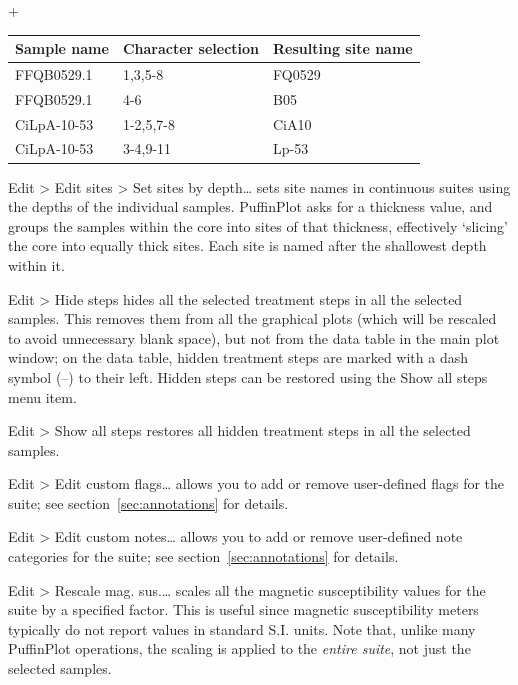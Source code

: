 \documentclass[a4paper,british]{article}
\newcommand{\menuitemlabel}[1]{%
\mbox{\textsf{#1}}\hfil}
\newenvironment{menuitemlist}%
{\begin{list}{}{%
\renewcommand{\makelabel}{\menuitemlabel}%
\setlength{\labelwidth}{35pt}%
\setlength{\leftmargin}%
             {\labelwidth+\labelsep}}}%
{\end{list}}
\newcommand{\ppcmd}[1]{\textsf{#1}} %
\newcommand{\submenu}{ \textgreater{} } %
\begin{document}
\begin{menuitemlist}
\begin{tabular}{lll} \toprule
Sample name & Character selection & Resulting site name \\ \midrule
FFQB0529.1 & 1,3,5-8 & FQ0529 \\
FFQB0529.1 & 4-6 & B05 \\
CiLpA-10-53 & 1-2,5,7-8 & CiA10 \\
CiLpA-10-53 & 3-4,9-11 & Lp-53 \\
\bottomrule \end{tabular}

\item[Edit\submenu Edit sites\submenu Set sites by depth\ldots] sets site
  names in continuous suites using the depths of the individual samples.
  PuffinPlot asks for a thickness value, and groups the samples within the
  core into sites of that thickness, effectively `slicing' the core into
  equally thick sites. Each site is named after the shallowest depth within
  it.

\item[Edit\submenu Hide steps] hides all the selected treatment steps in all
  the selected samples. This removes them from all the graphical plots (which
  will be rescaled to avoid unnecessary blank space), but not from the data
  table in the main plot window; on the data table, hidden treatment steps
  are marked with a dash symbol (--) to their left. Hidden steps can be
  restored using the \ppcmd{Show all steps} menu item.

\item[Edit\submenu Show all steps] restores all hidden treatment steps in all
  the selected samples.

\item[Edit\submenu Edit custom flags\ldots] allows you to add or remove
  user-defined flags for the suite; see section~\ref{sec:annotations} for
  details.

\item[Edit\submenu Edit custom notes\ldots] allows you to add or remove
  user-defined note categories for the suite; see
  section~\ref{sec:annotations} for details.

\item[Edit\submenu Rescale mag. sus.\ldots] scales all the magnetic
  susceptibility values for the suite by a specified factor. This is useful
  since magnetic susceptibility meters typically do not report values in
  standard S.I. units. Note that, unlike many PuffinPlot operations, the
  scaling is applied to the {\em entire suite}, not just the selected
  samples.

\end{menuitemlist}
\end{document}
